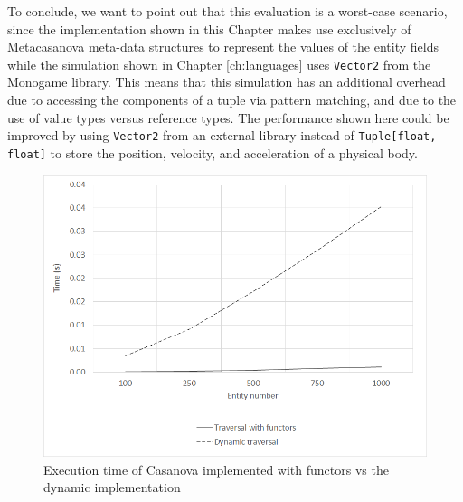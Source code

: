 To conclude, we want to point out that this evaluation is a worst-case scenario, since the implementation shown in this Chapter makes use exclusively of Metacasanova meta-data structures to represent the values of the entity fields while the simulation shown in Chapter \ref{ch:languages} uses \texttt{Vector2} from the Monogame library. This means that this simulation has an additional overhead due to accessing the components of a tuple via pattern matching, and due to the use of value types versus reference types. The performance shown here could be improved by using \texttt{Vector2} from an external library instead of \texttt{Tuple[float, float]} to store the position, velocity, and acceleration of a physical body.
\begin{table}
  \centering
 	\caption{Update time for one frame of the functor implementation of Casanova and the dynamic implementation shown in Chapter \ref{ch:languages}. The time is measured in seconds}
  \label{tab:ch_networking_evaluation}
\end{table}

\begin{figure}[!h]
  \centering
  \includegraphics[width=\textwidth]{Figures/chapter_networking/chart}
  \caption{Execution time of Casanova implemented with functors vs the dynamic implementation}
  \label{fig:ch_networking_chart}
\end{figure}

